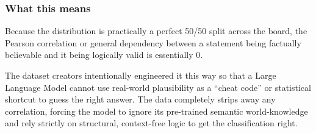 \documentclass[11pt]{article}
\begin{document}
\subsubsection*{What this means}
Because the distribution is practically a perfect 50/50 split across the board, the Pearson correlation or general dependency between a statement being factually believable and it being logically valid is essentially 0.

The dataset creators intentionally engineered it this way so that a Large Language Model cannot use real-world plausibility as a ``cheat code'' or statistical shortcut to guess the right answer. The data completely strips away any correlation, forcing the model to ignore its pre-trained semantic world-knowledge and rely strictly on structural, context-free logic to get the classification right.



\end{document}
